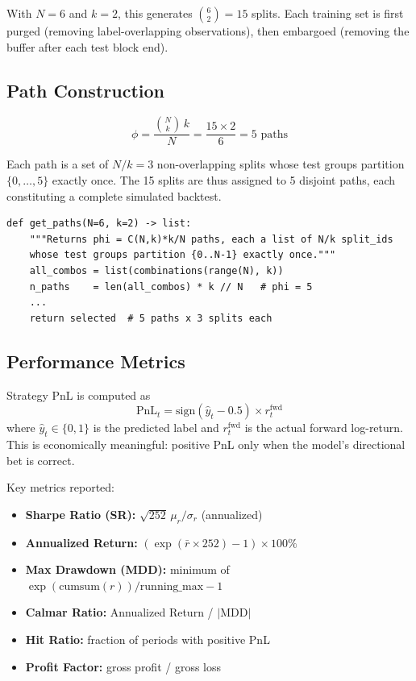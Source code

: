 \documentclass[11pt,a4paper]{article}
\begin{document}
With $N=6$ and $k=2$, this generates $\binom{6}{2} = 15$ splits.  Each
training set is first purged (removing label-overlapping observations), then
embargoed (removing the buffer after each test block end).

\subsection{Path Construction}

\[
  \phi = \frac{\binom{N}{k}\,k}{N} = \frac{15 \times 2}{6} = 5 \text{ paths}
\]

Each path is a set of $N/k = 3$ non-overlapping splits whose test groups
partition $\{0,\ldots,5\}$ exactly once.  The 15 splits are thus assigned to
5 disjoint paths, each constituting a complete simulated backtest.

\begin{lstlisting}
def get_paths(N=6, k=2) -> list:
    """Returns phi = C(N,k)*k/N paths, each a list of N/k split_ids
    whose test groups partition {0..N-1} exactly once."""
    all_combos = list(combinations(range(N), k))
    n_paths    = len(all_combos) * k // N   # phi = 5
    ...
    return selected  # 5 paths x 3 splits each
\end{lstlisting}

\subsection{Performance Metrics}

Strategy PnL is computed as
\[
  \text{PnL}_t = \text{sign}(\hat{y}_t - 0.5) \times r_t^{\text{fwd}}
\]
where $\hat{y}_t \in \{0,1\}$ is the predicted label and $r_t^{\text{fwd}}$ is
the actual forward log-return.  This is economically meaningful: positive PnL
only when the model's directional bet is correct.

Key metrics reported:
\begin{itemize}
  \item \textbf{Sharpe Ratio (SR):} $\sqrt{252}\,\mu_r/\sigma_r$ (annualized)
  \item \textbf{Annualized Return:} $(\exp(\bar{r} \times 252) - 1) \times 100\%$
  \item \textbf{Max Drawdown (MDD):} minimum of $\exp(\text{cumsum}(r)) / \text{running\_max} - 1$
  \item \textbf{Calmar Ratio:} Annualized Return / $|$MDD$|$
  \item \textbf{Hit Ratio:} fraction of periods with positive PnL
  \item \textbf{Profit Factor:} gross profit / gross loss
\end{itemize}
\end{document}
